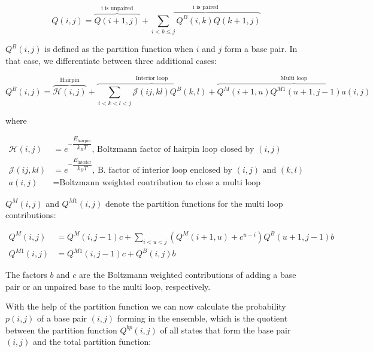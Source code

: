 \begin{equation*}
	Q(i,j)=\overbrace{Q(i+1,j)}^{\text{i is unpaired}}+\overbrace{\sum_{i<k\leq j} Q^B(i,k)Q(k+1,j)}^{\text{i is paired}}
\end{equation*}

$Q^B(i,j)$ is defined as the partition function when $i$ and $j$ form a base pair. In that case, we differentiate between three additional cases:

\begin{equation*}
	Q^B(i,j) = \overbrace{\mathcal{H}(i,j)}^{\text{Hairpin}}+\overbrace{\sum_{i<k<l<j}\mathcal{J}(ij,kl)Q^B(k,l)}^{\text{Interior loop}}+\overbrace{Q^M(i+1,u)Q^{M1}(u+1,j-1)a(i,j)}^{\text{Multi loop}}
\end{equation*}

where

\begin{equation*}
  \begin{aligned}
	\mathcal{H}(i,j) &= e^{-\dfrac{E_{\text{hairpin}}}{k_BT}}\text{, Boltzmann factor of hairpin loop closed by $(i,j)$} \\
	\mathcal{J}(ij,kl) &= e^{-\dfrac{E_{\text{interior}}}{k_BT}}\text{, B. factor of interior loop enclosed by $(i,j)$ and $(k,l)$} \\
	a(i,j) &= \text{Boltzmann weighted contribution to close a multi loop}
  \end{aligned}
\end{equation*}

$Q^M(i,j)$ and $Q^{M1}(i,j)$ denote the partition functions for the multi loop contributions:  

\begin{equation*}
  \begin{aligned}
	Q^M(i,j) &= Q^M(i,j-1)c + \sum_{i<u<j}(Q^M(i+1,u)+c^{u-i})Q^B(u+1,j-1)b \\
	Q^{M1}(i,j) &= Q^{M1}(i,j-1)c+Q^B(i,j)b
  \end{aligned}
\end{equation*} 

The factors $b$ and $c$ are the Boltzmann weighted contributions of adding a base pair or an unpaired base to the multi loop, respectively. 

With the help of the partition function we can now calculate the probability $p(i,j)$ of a base pair $(i,j)$ forming in the ensemble, which is the quotient between the partition function $Q^{bp}(i,j)$ of all states that form the base pair $(i,j)$ and the total partition function:

